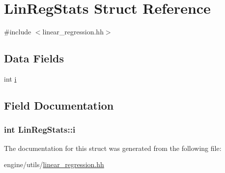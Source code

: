 \hypertarget{structLinRegStats}{
\section{LinRegStats Struct Reference}
\label{structLinRegStats}
}


{\ttfamily \#include $<$linear\_\-regression.hh$>$}

\subsection*{Data Fields}
\begin{DoxyCompactItemize}
\item 
int \hyperlink{structLinRegStats_abcd9d1768c12d7f76fd2d840add86dd9}{i}
\end{DoxyCompactItemize}


\subsection{Field Documentation}
\hypertarget{structLinRegStats_abcd9d1768c12d7f76fd2d840add86dd9}{
\subsubsection[{i}]{\setlength{\rightskip}{0pt plus 5cm}int {\bf LinRegStats::i}}}
\label{structLinRegStats_abcd9d1768c12d7f76fd2d840add86dd9}


The documentation for this struct was generated from the following file:\begin{DoxyCompactItemize}
\item 
engine/utils/\hyperlink{linear__regression_8hh}{linear\_\-regression.hh}\end{DoxyCompactItemize}
